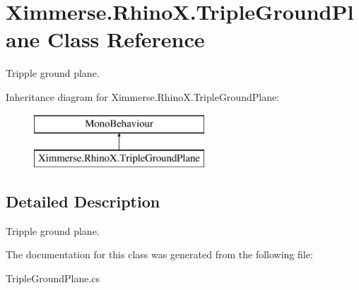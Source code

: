 \hypertarget{class_ximmerse_1_1_rhino_x_1_1_triple_ground_plane}{}\section{Ximmerse.\+Rhino\+X.\+Triple\+Ground\+Plane Class Reference}
\label{class_ximmerse_1_1_rhino_x_1_1_triple_ground_plane}


Tripple ground plane.  


Inheritance diagram for Ximmerse.\+Rhino\+X.\+Triple\+Ground\+Plane\+:\begin{figure}[H]
\begin{center}
\leavevmode
\includegraphics[height=2.000000cm]{class_ximmerse_1_1_rhino_x_1_1_triple_ground_plane}
\end{center}
\end{figure}


\subsection{Detailed Description}
Tripple ground plane. 



The documentation for this class was generated from the following file\+:\begin{DoxyCompactItemize}
\item 
Triple\+Ground\+Plane.\+cs\end{DoxyCompactItemize}
